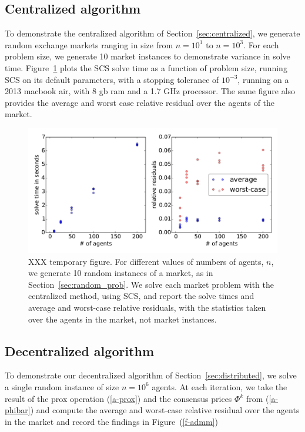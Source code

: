 \documentclass[12pt]{article}
\begin{document}
\subsection{Centralized algorithm}
To demonstrate the centralized algorithm of Section~\ref{sec:centralized},
we generate random exchange markets ranging in size
from $n=10^1$ to $n=10^3$.
For each problem size, we generate 10 market instances to demonstrate
variance in solve time.
Figure~\ref{f-cvxpy}
plots the SCS solve time as a function of problem size, running
SCS on its default parameters, with a stopping tolerance of $10^{-3}$,
running on a 2013 macbook air, with 8 gb ram and a 1.7 GHz processor.
The same figure also provides the average and worst case relative residual over the agents of the market.


\begin{figure}
\begin{center}
\includegraphics[width=1.0\textwidth]{figures/cvxpy}
\end{center}
\caption{XXX temporary figure. For different values of numbers of agents, $n$,
we generate 10 random instances of a market, as in Section~\ref{sec:random_prob}. We solve each market problem with the centralized method, using SCS, and report the solve times and average and worst-case relative residuals, with the statistics taken over the agents in the market, not market instances.}
\label{f-cvxpy}
\end{figure}


\subsection{Decentralized algorithm}
To demonstrate our decentralized algorithm of Section~\ref{sec:distributed},
we solve a single random instance of size $n=10^6$ agents.
At each iteration, we take the result of the prox operation (\ref{a-prox}) and the consensus prices $\Phi^k$ from (\ref{a-phibar}) and compute
the average and worst-case relative residual over the agents in the market
and record the findings
in Figure~(\ref{f-admm}) %
\end{document}
